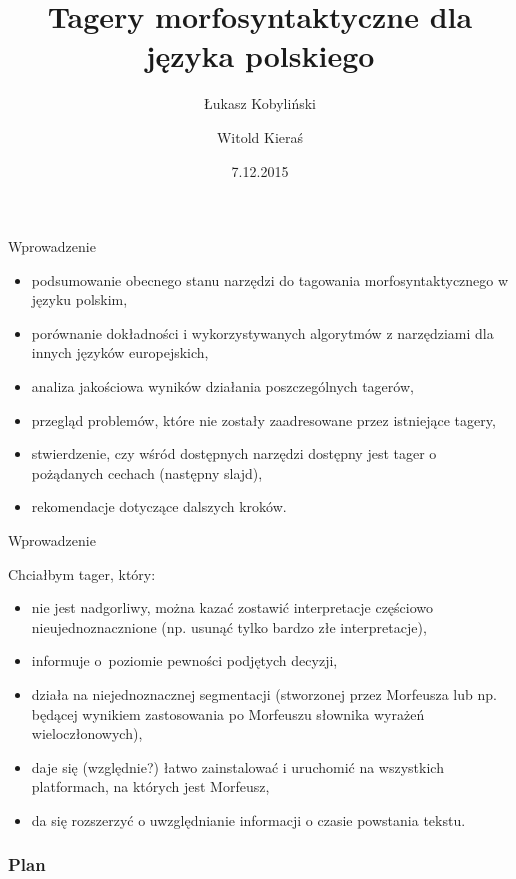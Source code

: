 \documentclass{beamer}
\title{Tagery morfosyntaktyczne dla języka polskiego}
\author{Łukasz Kobyliński \and Witold Kieraś}
\institute[IPI PAN]{%
     Instytut Podstaw Informatyki Polskiej Akademii Nauk\\
     ul. Jana Kazimierza 5, 01-248 Warszawa, Poland}
\date{7.12.2015}
\begin{document}
\begin{frame}
  \titlepage
\end{frame}

\begin{frame}{Wprowadzenie}
\begin{itemize}
  \item podsumowanie obecnego stanu narzędzi do tagowania morfosyntaktycznego w języku polskim,
  \item porównanie dokładności i wykorzystywanych algorytmów z narzędziami dla innych języków europejskich,
  \item analiza jakościowa wyników działania poszczególnych tagerów,
  \item przegląd problemów, które nie zostały zaadresowane przez istniejące tagery,
  \item stwierdzenie, czy wśród dostępnych narzędzi dostępny jest tager o pożądanych cechach (następny slajd),
  \item rekomendacje dotyczące dalszych kroków.
\end{itemize}
\end{frame}

\begin{frame}{Wprowadzenie}
  \vspace{0.5cm}

  Chciałbym tager, który:
   \begin{itemize}
   \item nie jest nadgorliwy, można kazać zostawić interpretacje częściowo nieujednoznacznione (np. usunąć tylko bardzo złe interpretacje),
   \item informuje o~poziomie pewności podjętych decyzji,
   \item działa na niejednoznacznej segmentacji (stworzonej przez Morfeusza lub np. będącej wynikiem zastosowania po Morfeuszu słownika wyrażeń wieloczłonowych),
   \item daje się (względnie?) łatwo zainstalować i uruchomić na wszystkich platformach, na których jest Morfeusz,
   \item da się rozszerzyć o uwzględnianie informacji o czasie powstania tekstu.
   \end{itemize}
\end{frame}

\begin{frame}
\frametitle{Plan}
\tableofcontents
\end{frame}
\end{document}
